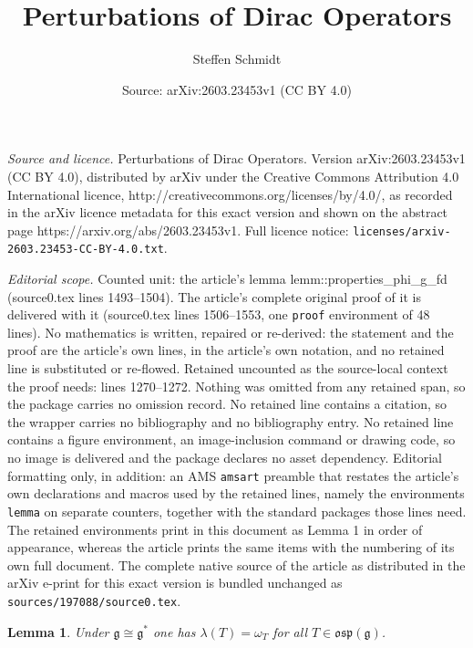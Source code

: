 \documentclass[10pt,a4paper]{amsart}
\title{Perturbations of Dirac Operators}
\author{Steffen Schmidt}
\date{Source: arXiv:2603.23453v1 (CC BY 4.0)}
\newtheorem{lemma}{Lemma}
\def\gg{{\mathfrak{g}}}
\def\osp{{\mathfrak{osp}}}
\begin{document}
\maketitle

\noindent\emph{Source and licence.} Perturbations of Dirac Operators. Version arXiv:2603.23453v1 (CC BY 4.0), distributed by arXiv under the Creative Commons Attribution 4.0 International licence, http://creativecommons.org/licenses/by/4.0/, as recorded in the arXiv licence metadata for this exact version and shown on the abstract page https://arxiv.org/abs/2603.23453v1. Full licence notice: \texttt{licenses/arxiv-2603.23453-CC-BY-4.0.txt}.\par\smallskip

\noindent\textit{Editorial scope.} Counted unit: the article's lemma lemm::properties\_phi\_g\_fd (source0.tex lines 1493--1504). The article's complete original proof of it is delivered with it (source0.tex lines 1506--1553, one \texttt{proof} environment of 48 lines). No mathematics is written, repaired or re-derived: the statement and the proof are the article's own lines, in the article's own notation, and no retained line is substituted or re-flowed.  Retained uncounted as the source-local context the proof needs: lines 1270--1272.  Nothing was omitted from any retained span, so the package carries no omission record.  No retained line contains a citation, so the wrapper carries no bibliography and no bibliography entry.  No retained line contains a figure environment, an image-inclusion command or drawing code, so no image is delivered and the package declares no asset dependency.  Editorial formatting only, in addition: an AMS \texttt{amsart} preamble that restates the article's own declarations and macros used by the retained lines, namely the environments \texttt{lemma} on separate counters, together with the standard packages those lines need.  The retained environments print in this document as Lemma 1 in order of appearance, whereas the article prints the same items with the numbering of its own full document.  The complete native source of the article as distributed in the arXiv e-print for this exact version is bundled unchanged as \texttt{sources/197088/source0.tex}.
\begin{lemma}\label{lemm::identification_lambda_omega}
Under $\gg\cong \gg^{\ast}$ one has $\lambda(T)=\omega_{T}$ for all $T\in\osp(\gg)$.
\end{lemma}
\end{document}
